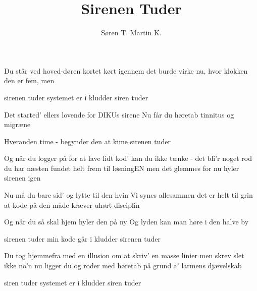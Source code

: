 \documentclass[a4paper,11pt]{article}
\title{Sirenen Tuder}
\author{Søren T. Martin K.}
\begin{document}
\twocolumn[ %
\maketitle
]
\begin{song}
Du står ved hoved-døren
kortet kørt igennem
det burde virke nu, 
hvor klokken den er fem, men

{}
sirenen tuder
systemet er i kludder
siren tuder

Det started' ellers lovende
for DIKUs sirene
Nu får du høretab 
tinnitus og migræne

Hveranden time - 
begynder den at kime
sirenen tuder

{}
Og når du logger på 
for at lave lidt kod'
kan du ikke tænke - 
det bli'r noget rod
du har næsten fundet 
helt frem til løsningEN
men det glemmes for
nu hyler sirenen igen

Nu må du bare sid' og lytte
til den hvin
Vi synes allesammen 
det er helt til grin
at kode på den måde
kræver uhørt disciplin

{}


Og når du så skal hjem
hyler den på ny
Og lyden kan man høre
i den halve by

{}
sirenen tuder
min kode går i kludder
sirenen tuder

{}
Du tog hjemmefra
med en illusion
om at skriv' en masse linier
men skrev slet ikke no'n
nu ligger du og roder
med høretab
på grund a' larmens
djævelskab

{}
siren tuder
systemet er i kludder
siren tuder

\end{song}
\end{document}
